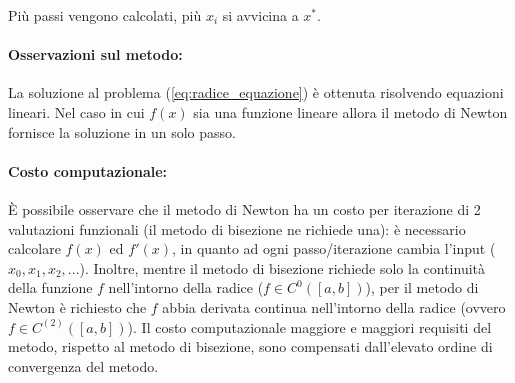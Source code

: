 Più passi vengono calcolati, più $x_i$ si avvicina a $x^*$.

\paragraph{Osservazioni sul metodo:} La soluzione al problema (\ref{eq:radice_equazione}) è ottenuta risolvendo \gls{equazioni lineari}. Nel caso in cui $f(x)$ sia una \gls{funzione lineare} allora il metodo di Newton fornisce la soluzione in un solo passo.

\paragraph{Costo computazionale:} È possibile osservare che il metodo di Newton ha un costo per iterazione di 2 valutazioni funzionali (il metodo di bisezione ne richiede una): è necessario calcolare $f(x)$ ed $f'(x)$, in quanto ad ogni passo/iterazione cambia l'input ($x_0, x_1, x_2, \hdots$).
Inoltre, mentre il metodo di bisezione richiede solo la continuità della funzione $f$ nell'intorno della radice ($f\in C^0([a,b])$), per il metodo di Newton è richiesto che $f$ abbia derivata continua nell'intorno della radice (ovvero $f\in C^{(2)}([a,b])$).
Il costo computazionale maggiore e maggiori requisiti del metodo, rispetto al metodo di bisezione, sono compensati dall'elevato ordine di convergenza del metodo.

